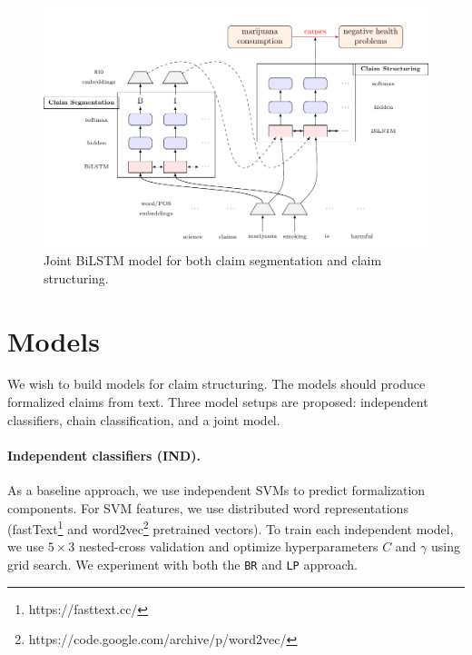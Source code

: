 \begin{figure}
	\includegraphics{joint_tikz-figure0.pdf}
	\caption{Joint BiLSTM model for both claim segmentation and claim 
	structuring. }
	\label{fig:joint_model}
\end{figure}

\section{Models}
\label{sec:claim_struc_models}

We wish to build models for claim structuring. The models should produce 
formalized claims from text. 
Three model setups are proposed: independent classifiers, 
chain classification, and a joint model. 

\paragraph{Independent classifiers (IND). }
As a baseline approach, we use independent SVMs to predict formalization
components.
For SVM features, we use distributed word representations
(fastText\footnote{https://fasttext.cc/}
and word2vec\footnote{https://code.google.com/archive/p/word2vec/}
pretrained vectors).
To train each independent model, we use $5 \times 3$ nested-cross validation
and optimize hyperparameters $C$ and $\gamma$ using grid search. 
We experiment with both the \texttt{BR} and \texttt{LP} approach.


